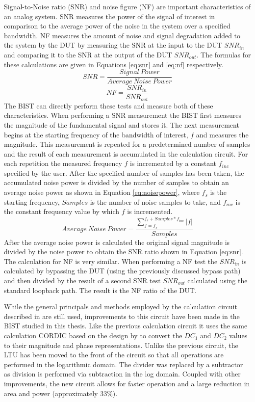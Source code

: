 \documentclass[12pt]{report}
\begin{document}
Signal-to-Noise ratio (SNR) and noise figure (NF) are important characteristics of an analog system.  SNR measures the power of the signal of interest in comparison to the average power of the noise in the system over a specified bandwidth.  NF measures the amount of noise and signal degradation added to the system by the DUT by measuring the SNR at the input to the DUT $SNR_{in}$ and comparing it to the SNR at the output of the DUT $SNR_{out}$.  The formulas for these calculations are given in Equations \ref{eq:snr} and \ref{eq:nf} respectively\cite{stroud-nf}.
\begin{equation}
SNR = \frac{Signal\ Power}{Average\ Noise\ Power}
\label{eq:snr}
\end{equation}
\begin{equation}
NF = \frac{SNR_{in}}{SNR_{out}}
\label{eq:nf}
\end{equation}
The BIST can directly perform these tests and measure both of these characteristics.  When performing a SNR measurement the BIST first measures the magnitude of the fundamental signal and stores it.  The next measurement begins at the starting frequency of the bandwidth of interest, $f$ and measures the magnitude.  This measurement is repeated for a predetermined number of samples and the result of each measurement is accumulated in the calculation circuit.  For each repetition the measured frequency $f$ is incremented by a constant $f_{inc}$ specified by the user.  After the specified number of samples has been taken, the accumulated noise power is divided by the number of samples to obtain an average noise power as shown in Equation \ref{eq:noisepower}, where $f_s$ is the starting frequency, $Samples$ is the number of noise samples to take, and $f_{inc}$ is the constant frequency value by which $f$ is incremented.
\begin{equation}
Average\ Noise\ Power =  \frac{\sum_{f=f_s}^{f_s+Samples*f_{inc}} |f|}{Samples}
\label{eq:noisepower}
\end{equation}
After the average noise power is calculated the original signal magnitude is divided by the noise power to obtain the SNR ratio shown in Equation \ref{eq:snr}.  The calculation for NF is very similar.  When performing a NF test the $SNR_{in}$ is calculated by bypassing the DUT (using the previously discussed bypass path) and then divided by the result of a second SNR test $SNR_{out}$ calculated using the standard loopback path.  The result is the NF ratio of the DUT\cite{stroud-nf}.

While the general principals and methods employed by the calculation circuit described in \cite{joey} are still used, improvements to this circuit have been made in the BIST studied in this thesis.  Like the previous calculation circuit it uses the same calculation CORDIC based on the design by \cite{joey} to convert the $DC_1$ and $DC_2$ values to their magnitude and phase representations.  Unlike the previous circuit, the LTU has been moved to the front of the circuit so that all operations are performed in the logarithmic domain.  The divider was replaced by a subtractor as division is performed via subtraction in the log domain.  Coupled with other improvements, the new circuit allows for faster operation and a large reduction in area and power (approximately 33\%).
\end{document}
